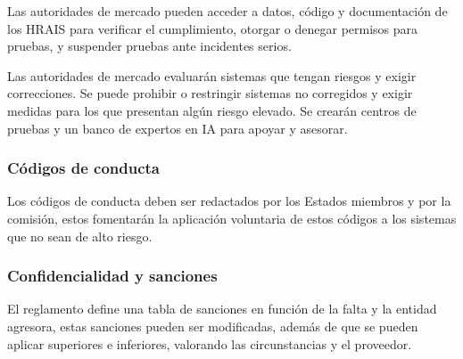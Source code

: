 Las autoridades de mercado pueden acceder a datos, código y documentación de los \acrshort{HRAIS} para verificar el cumplimiento, otorgar o denegar permisos para pruebas, y suspender pruebas ante incidentes serios.

Las autoridades de mercado evaluarán sistemas que tengan riesgos y exigir correcciones. Se puede prohibir o restringir sistemas no corregidos y exigir medidas para los que presentan algún riesgo elevado. Se crearán centros de pruebas y un banco de expertos en \acrfull{IA} para apoyar y asesorar.

\subsubsection{Códigos de conducta}

Los códigos de conducta deben ser redactados por los Estados miembros y por la comisión, estos fomentarán la aplicación voluntaria de estos códigos a los sistemas que no sean de alto riesgo.

\subsubsection{Confidencialidad y sanciones}

El reglamento define una tabla de sanciones en función de la falta y la entidad agresora, estas sanciones pueden ser modificadas, además de que se pueden aplicar superiores e inferiores, valorando las circunstancias y el proveedor.




